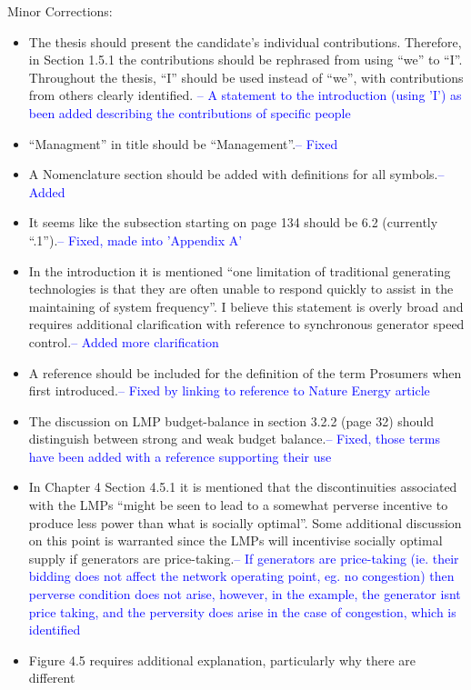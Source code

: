 \documentclass{article}
\begin{document}
Minor Corrections:
\begin{itemize}
\item	The thesis should present the candidate’s individual contributions. Therefore,
in Section 1.5.1 the contributions should be rephrased from using “we” to “I”.
Throughout the thesis, “I” should be used instead of “we”, with contributions
from others clearly identified. \textcolor{blue}{-- A statement to the introduction (using 'I') as been added describing the contributions of specific people}
\item	“Managment” in title should be “Management”.\textcolor{blue}{-- Fixed}
\item	A Nomenclature section should be added with definitions for all symbols.\textcolor{blue}{-- Added}
\item	It seems like the subsection starting on page 134 should be 6.2 (currently
“.1”).\textcolor{blue}{-- Fixed, made into 'Appendix A'}
\item	In the introduction it is mentioned “one limitation of traditional generating
technologies is that they are often unable to respond quickly to assist in the
maintaining of system frequency”. I believe this statement is overly broad and
requires additional clarification with reference to synchronous generator
speed control.\textcolor{blue}{-- Added more clarification}
\item	A reference should be included for the definition of the term Prosumers when
first introduced.\textcolor{blue}{-- Fixed by linking to reference to Nature Energy article}
\item	The discussion on LMP budget-balance in section 3.2.2 (page 32) should
distinguish between strong and weak budget balance.\textcolor{blue}{-- Fixed, those terms have been added with a reference supporting their use}
\item	In Chapter 4 Section 4.5.1 it is mentioned that the discontinuities associated
with the LMPs “might be seen to lead to a somewhat perverse incentive to
produce less power than what is socially optimal”. Some additional discussion
on this point is warranted since the LMPs will incentivise socially optimal
supply if generators are price-taking.\textcolor{blue}{-- If generators are price-taking (ie. their bidding does not affect the network operating point, eg. no congestion) then perverse condition does not arise, however, in the example, the generator isnt price taking, and the perversity does arise in the case of congestion, which is identified}
\item	Figure 4.5 requires additional explanation, particularly why there are different

\end{itemize}
\end{document}
